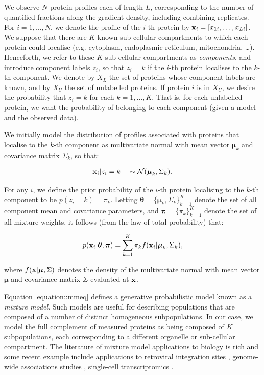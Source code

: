 \documentclass[12pt,english]{article}\usepackage[]{graphicx}\usepackage[]{color}
\begin{document}
We observe $N$ protein profiles each of length $L$, corresponding to
the number of quantified fractions along the gradient density,
including combining replicates.  For $i = 1, \ldots, N$, we denote the
profile of the $i$-th protein by
${\bf x}_i = [x_{1i}, \ldots, x_{Li}]$.  We suppose that there are $K$
known sub-cellular compartments to which each protein could localise
(e.g. cytoplasm, endoplasmic reticulum, mitochondria, \ldots).
Henceforth, we refer to these $K$ sub-cellular compartments as {\em
  components}, and introduce component labels $z_i$, so that $z_i = k$
if the $i$-th protein localises to the $k$-th component. We denote by
$X_L$ the set of proteins whose component labels are known, and by
$X_U$ the set of unlabelled proteins.  If protein $i$ is in $X_U$, we
desire the probability that $z_i = k$ for each $k = 1, \ldots, K$.
That is, for each unlabelled protein, we want the probability of
belonging to each component (given a model and the observed data).


We initially model the distribution of profiles associated with
proteins that localise to the $k$-th component as multivariate normal
with mean vector $\boldsymbol{\mu}_k$ and covariance matrix
$\Sigma_k$, so that:

\begin{align}
{\bf x}_i | z_i = k \quad \sim \mathcal{N}(\boldsymbol{\mu}_k, \Sigma_k). \label{equation::preq}
\end{align}

For any $i$, we define the prior probability of the $i$-th protein
localising to the $k$-th component to be $p(z_i = k) = \pi_k$.
Letting
$\boldsymbol{\theta} = \{\boldsymbol{\mu}_k, \Sigma_k \}_{k = 1}^K$
denote the set of all component mean and covariance parameters, and
$\boldsymbol{\pi} = \{\pi_k\}_{k = 1}^K$ denote the set of all mixture
weights, it follows (from the law of total probability) that:

\begin{align}
p({\bf x}_i | \boldsymbol{\theta}, \boldsymbol{\pi} ) = \sum_{k = 1}^K \pi_k f({\bf x}_i|\boldsymbol{\mu}_k, \Sigma_k),\label{equation::mmeq}
\end{align}

where $f({\bf x} | \boldsymbol{\mu}, \Sigma)$ denotes the density of
the multivariate normal with mean vector $\boldsymbol{\mu}$ and
covariance matrix $\Sigma$ evaluated at ${\bf x}$.

Equation \eqref{equation::mmeq} defines a generative probabilistic
model known as a {\em mixture model}.  Such models are useful for
describing populations that are composed of a number of distinct
homogeneous subpopulations.  In our case, we model the full complement
of measured proteins as being composed of $K$ subpopulations, each
corresponding to a different organelle or sub-cellular
compartment. The literature of mixture model applications to biology
is rich and some recent example include applications to retroviral
integration sites \citep{Kirk:2016}, genome-wide associations studies
\citep{Liley:2017}, single-cell transcriptomics
\citep{Lonnberg:2017} {\color{black}{and affinity purification MS proteomics}}
\citep{Choi:2010}.
\end{document}
